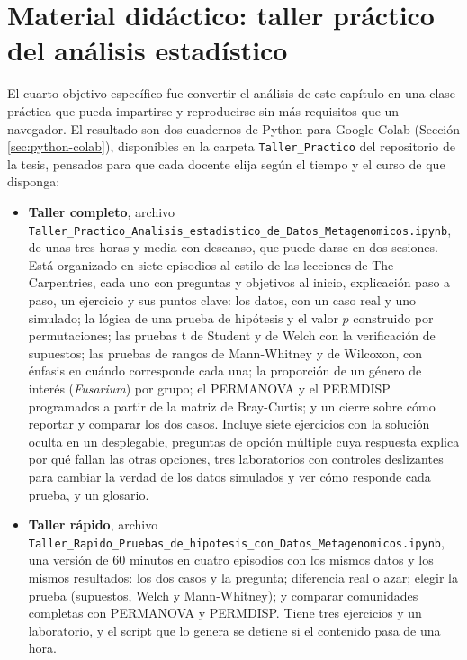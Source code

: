 \section[Material didáctico: taller práctico]{Material didáctico: taller práctico del análisis estadístico}
\label{sec:res-taller}

El cuarto objetivo específico fue convertir el análisis de este capítulo en una clase práctica que
pueda impartirse y reproducirse sin más requisitos que un navegador. El resultado son dos cuadernos
de Python para Google Colab (Sección \ref{sec:python-colab}), disponibles en la carpeta
\texttt{Taller\_Practico} del repositorio de la tesis, pensados para que cada docente elija según el
tiempo y el curso de que disponga:

\begin{itemize}
    \item \textbf{Taller completo}, archivo\\
    {\footnotesize\texttt{Taller\_Practico\_Analisis\_estadistico\_de\_Datos\_Metagenomicos.ipynb}},\\
    de unas tres horas y media con descanso, que puede darse en dos sesiones. Está organizado en siete
    episodios al estilo de las lecciones de The Carpentries, cada uno con preguntas y objetivos al
    inicio, explicación paso a paso, un ejercicio y sus puntos clave: los datos, con un caso real y
    uno simulado; la lógica de una prueba de hipótesis y el valor $p$ construido por permutaciones;
    las pruebas t de Student y de Welch con la verificación de supuestos; las pruebas de rangos de
    Mann-Whitney y de Wilcoxon, con énfasis en cuándo corresponde cada una; la proporción de un
    género de interés (\textit{Fusarium}) por grupo; el PERMANOVA y el PERMDISP programados a partir
    de la matriz de Bray-Curtis; y un cierre sobre cómo reportar y comparar los dos casos. Incluye
    siete ejercicios con la solución oculta en un desplegable, preguntas de opción múltiple cuya
    respuesta explica por qué fallan las otras opciones, tres laboratorios con controles deslizantes
    para cambiar la verdad de los datos simulados y ver cómo responde cada prueba, y un glosario.
    \item \textbf{Taller rápido}, archivo\\
    {\footnotesize\texttt{Taller\_Rapido\_Pruebas\_de\_hipotesis\_con\_Datos\_Metagenomicos.ipynb}},\\
    una versión de 60 minutos en cuatro episodios con los mismos datos y los mismos resultados: los
    dos casos y la pregunta; diferencia real o azar; elegir la prueba (supuestos, Welch y
    Mann-Whitney); y comparar comunidades completas con PERMANOVA y PERMDISP. Tiene tres ejercicios y
    un laboratorio, y el script que lo genera se detiene si el contenido pasa de una hora.
\end{itemize}

